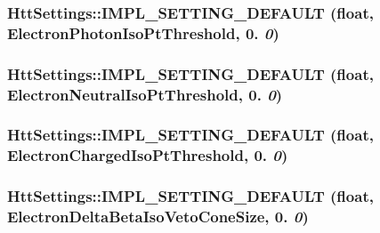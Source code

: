 \label{classHttSettings_a1515904af8a4c5d04f38bb8a4e115e6a}
\hypertarget{classHttSettings_aa852f1b761559bf02dbb4bcaa383b6b6}{
\subsubsection[{IMPL\_\-SETTING\_\-DEFAULT}]{\setlength{\rightskip}{0pt plus 5cm}HttSettings::IMPL\_\-SETTING\_\-DEFAULT (float, \/  ElectronPhotonIsoPtThreshold, \/  0. {\em 0})}}
\label{classHttSettings_aa852f1b761559bf02dbb4bcaa383b6b6}
\hypertarget{classHttSettings_afe73b2edaa37f30d09551330aa189d3c}{
\subsubsection[{IMPL\_\-SETTING\_\-DEFAULT}]{\setlength{\rightskip}{0pt plus 5cm}HttSettings::IMPL\_\-SETTING\_\-DEFAULT (float, \/  ElectronNeutralIsoPtThreshold, \/  0. {\em 0})}}
\label{classHttSettings_afe73b2edaa37f30d09551330aa189d3c}
\hypertarget{classHttSettings_a71a51453e53eef46fd821b8a2b66382f}{
\subsubsection[{IMPL\_\-SETTING\_\-DEFAULT}]{\setlength{\rightskip}{0pt plus 5cm}HttSettings::IMPL\_\-SETTING\_\-DEFAULT (float, \/  ElectronChargedIsoPtThreshold, \/  0. {\em 0})}}
\label{classHttSettings_a71a51453e53eef46fd821b8a2b66382f}
\hypertarget{classHttSettings_ade12a467db9b7a59ff20c73fa11bd768}{
\subsubsection[{IMPL\_\-SETTING\_\-DEFAULT}]{\setlength{\rightskip}{0pt plus 5cm}HttSettings::IMPL\_\-SETTING\_\-DEFAULT (float, \/  ElectronDeltaBetaIsoVetoConeSize, \/  0. {\em 0})}}
\label{classHttSettings_ade12a467db9b7a59ff20c73fa11bd768}
